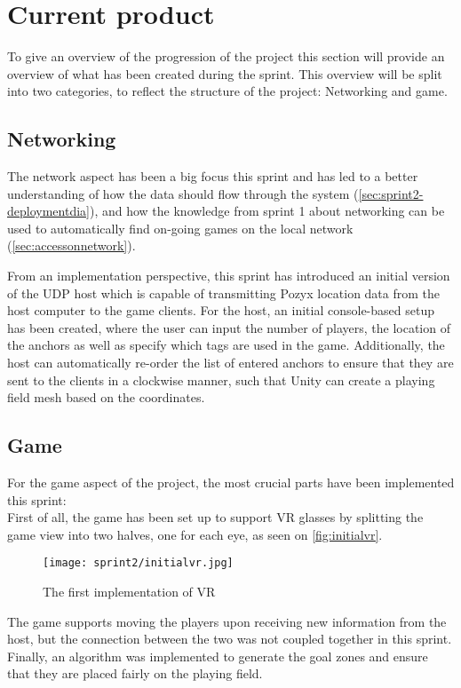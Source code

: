 \section{Current product}
To give an overview of the progression of the project this section will provide an overview of what has been created during the sprint.
This overview will be split into two categories, to reflect the structure of the project: Networking and game.

\subsection{Networking}
The network aspect has been a big focus this sprint and has led to a better understanding of how the data should flow through the system (\autoref{sec:sprint2-deploymentdia}), and how the knowledge from sprint 1 about networking can be used to automatically find on-going games on the local network (\autoref{sec:accessonnetwork}).

From an implementation perspective, this sprint has introduced an initial version of the UDP host which is capable of transmitting Pozyx location data from the host computer to the game clients.
For the host, an initial console-based setup has been created, where the user can input the number of players, the location of the anchors as well as specify which tags are used in the game.
Additionally, the host can automatically re-order the list of entered anchors to ensure that they are sent to the clients in a clockwise manner, such that Unity can create a playing field mesh based on the coordinates.

\subsection{Game}
For the game aspect of the project, the most crucial parts have been implemented this sprint:\\
First of all, the game has been set up to support VR glasses by splitting the game view into two halves, one for each eye, as seen on \autoref{fig:initialvr}.

\begin{figure}[H]
	\centering
	\texttt{[image: sprint2/initialvr.jpg]}
	\caption{The first implementation of VR}
	\label{fig:initialvr}
\end{figure}
\noindent
The game supports moving the players upon receiving new information from the host, but the connection between the two was not coupled together in this sprint.
Finally, an algorithm was implemented to generate the goal zones and ensure that they are placed fairly on the playing field.
